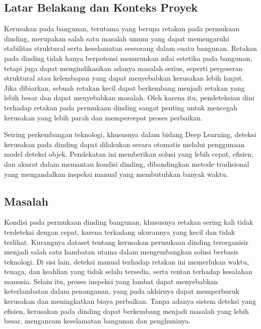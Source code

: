 \documentclass[12pt,a4paper]{article}
\begin{document}
\subsection{Latar Belakang dan Konteks Proyek}
\begin{adjustwidth}{3em}{0pt} 
\hspace{0.5cm} Kerusakan pada bangunan, terutama yang berupa retakan pada permukaan dinding, merupakan salah satu masalah umum yang dapat memengaruhi stabilitas struktural serta keselamatan seseorang dalam suatu bangunan. Retakan pada dinding tidak hanya berpotensi menurunkan nilai estetika pada bangunan, tetapi juga dapat mengindikasikan adanya masalah serius, seperti pergeseran struktural atau kelembapan yang dapat menyebabkan kerusakan lebih lanjut. Jika dibiarkan, sebuah retakan kecil dapat berkembang menjadi retakan yang lebih besar dan dapat menyebabkan masalah. Oleh karena itu, pendeteksian dini terhadap retakan pada permukaan dinding sangat penting untuk mencegah kerusakan yang lebih parah dan mempercepat proses perbaikan.

Seiring perkembangan teknologi, khususnya dalam bidang Deep Learning, deteksi kerusakan pada dinding dapat dilakukan secara otomatis melalui penggunaan model deteksi objek. Pendekatan ini memberikan solusi yang lebih cepat, efisien, dan akurat dalam memantau kondisi dinding, dibandingkan metode tradisional yang mengandalkan inspeksi manual yang membutuhkan banyak waktu.
\end{adjustwidth}

\subsection{Masalah}
\begin{adjustwidth}{3em}{0pt} 
\hspace{0.5cm} Kondisi pada permukaan dinding bangunan, khususnya retakan sering kali tidak terdeteksi dengan cepat, karena terkadang ukurannya yang kecil dan tidak terlihat. Kurangnya dataset tentang kerusakan permukaan dinding terorganisir menjadi salah satu hambatan utama dalam mengembangkan solusi berbasis teknologi. Di sisi lain, deteksi manual terhadap retakan ini memerlukan waktu, tenaga, dan keahlian yang tidak selalu tersedia, serta rentan terhadap kesalahan manusia. Selain itu, proses inspeksi yang lambat dapat menyebabkan keterlambatan dalam penanganan, yang pada akhirnya dapat memperburuk kerusakan dan meningkatkan biaya perbaikan. Tanpa adanya sistem deteksi yang efisien, kerusakan pada dinding dapat berkembang menjadi masalah yang lebih besar, mengancam keselamatan bangunan dan penghuninya.
\end{adjustwidth}
\end{document}
